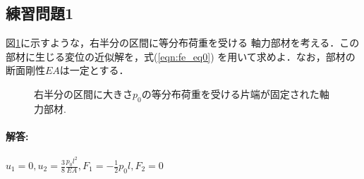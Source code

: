 \documentclass[10pt,a4j]{jarticle}
\begin{document}
\subsection{練習問題1}
図\ref{fig:fig8}に示すような，右半分の区間に等分布荷重を受ける
軸力部材を考える．この部材に生じる変位の近似解を，式(\ref{eqn:fe_eq0})
を用いて求めよ．なお，部材の断面剛性$EA$は一定とする．
\begin{figure}[h]
	\begin{center}
	\end{center}
	\caption{右半分の区間に大きさ$p_0$の等分布荷重を受ける片端が固定された軸力部材.} 
	\label{fig:fig8}
\end{figure}
\paragraph{解答:}$u_1=0,u_2=\frac{3}{8}\frac{p_0l^2}{EA}, F_1=-\frac{1}{2}p_0l, F_2=0$
\end{document}
